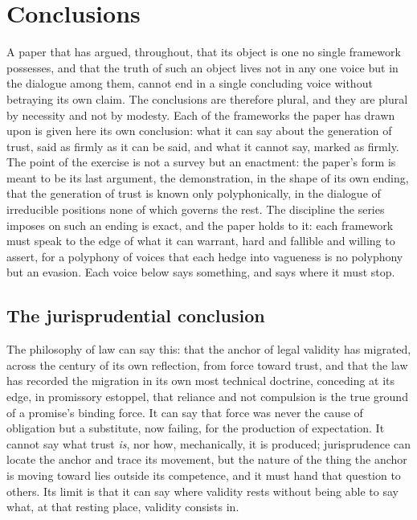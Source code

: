 \section{Conclusions}
\label{p13:sec:conclusions}

\noindent
A paper that has argued, throughout, that its object is one no single framework possesses, and that the truth of such an object lives not in any one voice but in the dialogue among them, cannot end in a single concluding voice without betraying its own claim. The conclusions are therefore plural, and they are plural by necessity and not by modesty. Each of the frameworks the paper has drawn upon is given here its own conclusion: what it can say about the generation of trust, said as firmly as it can be said, and what it cannot say, marked as firmly. The point of the exercise is not a survey but an enactment: the paper's form is meant to be its last argument, the demonstration, in the shape of its own ending, that the generation of trust is known only polyphonically, in the dialogue of irreducible positions none of which governs the rest. The discipline the series imposes on such an ending is exact, and the paper holds to it: each framework must speak to the edge of what it can warrant, hard and fallible and willing to assert, for a polyphony of voices that each hedge into vagueness is no polyphony but an evasion. Each voice below says something, and says where it must stop.

\subsection*{The jurisprudential conclusion}
\label{p13:sub:concl-jur}

The philosophy of law can say this: that the anchor of legal validity has migrated, across the century of its own reflection, from force toward trust, and that the law has recorded the migration in its own most technical doctrine, conceding at its edge, in promissory estoppel, that reliance and not compulsion is the true ground of a promise's binding force. It can say that force was never the cause of obligation but a substitute, now failing, for the production of expectation. It cannot say what trust \emph{is}, nor how, mechanically, it is produced; jurisprudence can locate the anchor and trace its movement, but the nature of the thing the anchor is moving toward lies outside its competence, and it must hand that question to others. Its limit is that it can say where validity rests without being able to say what, at that resting place, validity consists in.

